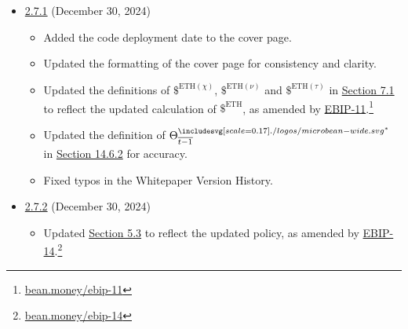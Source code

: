 \documentclass[class=article, crop=false]{standalone}
\begin{document}
\begin{itemize}[topsep=0pt, itemsep=3pt,leftmargin=16pt]
    \item \href{https://github.com/BeanstalkFarms/Beanstalk-Whitepaper/blob/master/version-history/beanstalk2_7_1.pdf}{2.7.1} (December 30, 2024)
    
    \begin{itemize}
        \item Added the code deployment date to the cover page.
        \item Updated the formatting of the cover page for consistency and clarity.
        \item Updated the definitions of $\$^{\text{ETH}(\chi)}$, $\$^{\text{ETH}(\nu)}$ and $\$^{\text{ETH}(\tau)}$ in \hyperlink{subsection.7.1}{Section 7.1} to reflect the updated calculation of $\$^{\text{ETH}}$, as amended by \href{https://bean.money/ebip-11}{EBIP-11}.\footnote{\href{https://bean.money/ebip-11}{bean.money/ebip-11}}
        \item Updated the definition of $\Theta_{\overline{t-1}}^{{\bean}^*}$ in \hyperlink{subsubsection.14.6.2}{Section 14.6.2} for accuracy.
        \item Fixed typos in the Whitepaper Version History.
    \end{itemize}

        \item \href{https://github.com/BeanstalkFarms/Beanstalk-Whitepaper/blob/master/version-history/beanstalk2_7_2.pdf}{2.7.2} (December 30, 2024)
    
    \begin{itemize}
        \item Updated \hyperlink{subsection.5.3}{Section 5.3} to reflect the updated 
         policy, as amended by \href{https://bean.money/ebip-14}{EBIP-14}.\footnote{\href{https://bean.money/ebip-14}{bean.money/ebip-14}}
    \end{itemize}
\end{itemize}
\end{document}
